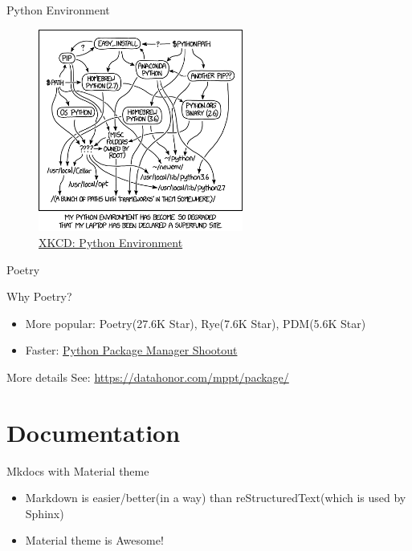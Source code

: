 \documentclass{ctexbeamer}
\begin{document}
\begin{frame}{Python Environment}

    \begin{figure}
        \includegraphics[width=0.6\textwidth, height=0.7\textheight]{./figures/python_environment.png}
        \caption{\href{https://xkcd.com/1987/}{XKCD: Python Environment}}
    \end{figure}

\end{frame}



\begin{frame}{Poetry}
    
    \begin{exampleblock}{Why Poetry?}
        \begin{itemize}
            \item More popular: Poetry(27.6K Star), Rye(7.6K Star), PDM(5.6K Star)
            \item Faster: \href{https://lincolnloop.github.io/python-package-manager-shootout/}{Python Package Manager Shootout}
        \end{itemize}
    \end{exampleblock}

\end{frame}


\begin{frame}{More details}
    See: \href{https://datahonor.com/mppt/package/}{https://datahonor.com/mppt/package/}
\end{frame}

\section{Documentation}
\begin{frame}{Mkdocs with Material theme}
    \begin{itemize}
        \item Markdown is easier/better(in a way) than reStructuredText(which is used by Sphinx)
        \item Material theme is Awesome!
    \end{itemize}
\end{frame}
\end{document}
